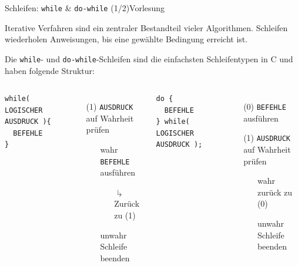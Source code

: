 \documentclass[xcolor=dvipsnames]{beamer}
\newcounter{lecturecounter}
\begin{document}
\begin{frame}[fragile]{Schleifen: \texttt{while} \& \texttt{do-while} (1/2)}{Vorlesung }
\begin{block}{}
  Iterative Verfahren sind ein zentraler Bestandteil vieler Algorithmen.
  Schleifen wiederholen Anweisungen, bis eine gewählte Bedingung erreicht ist.
\end{block}
Die \texttt{while}- und \texttt{do-while}-Schleifen sind die einfachsten Schleifentypen in C und haben folgende Struktur:
\vspace{0.2cm}
\begin{columns}
\begin{lstlisting}
while( LOGISCHER AUSDRUCK ){
  BEFEHLE
}  
\end{lstlisting}
\begin{enumerate}
  \item[(1)]{ \texttt{AUSDRUCK} auf Wahrheit prüfen }
  \begin{itemize}
    \item[wahr]{ \texttt{BEFEHLE} ausführen }
    \begin{itemize}
      \item[$\drsh$]{Zurück zu (1)}
    \end{itemize}
    \item[unwahr]{ Schleife beenden }
  \end{itemize}
\end{enumerate}

\begin{lstlisting}
do {
  BEFEHLE
} while( LOGISCHER AUSDRUCK ); 
\end{lstlisting}
\begin{enumerate}
  \item[(0)]{ \texttt{BEFEHLE} ausführen }
  \item[(1)]{ \texttt{AUSDRUCK} auf Wahrheit prüfen }
  \begin{itemize}
    \item[wahr]{ zurück zu (0) }
    \item[unwahr]{ Schleife beenden }
  \end{itemize}
\end{enumerate}

\end{columns}

\end{frame}
\end{document}
